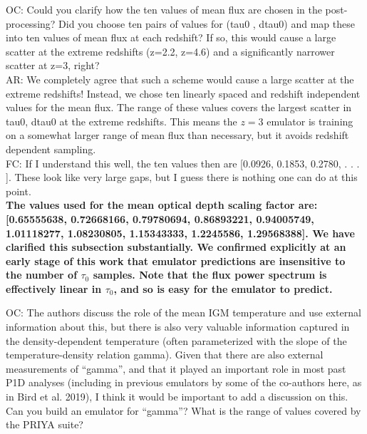 \documentclass[12pt]{article}
\begin{document}
\hrulefill \newline

OC: Could you clarify how the ten values of mean flux are chosen in the post-processing? Did you choose ten pairs of values for (tau0 , dtau0) and map these into ten values of mean flux at each redshift? If so, this would cause a large scatter at the extreme redshifts (z=2.2, z=4.6) and a significantly narrower scatter at z=3, right?\\

AR: We completely agree that such a scheme would cause a large scatter at the extreme redshifts! Instead, we chose ten linearly spaced and redshift independent values for the mean flux. The range of these values covers the largest scatter in tau0, dtau0 at the extreme redshifts. This means the $z=3$ emulator is training on a somewhat larger range of mean flux than necessary, but it avoids redshift dependent sampling.\\

FC: If I understand this well, the ten values then are [0.0926, 0.1853, 0.2780, . . . ]. These look like very large gaps, but I guess there is nothing one can do at this point.\\

\textbf{The values used for the mean optical depth scaling factor are: [0.65555638, 0.72668166, 0.79780694, 0.86893221, 0.94005749, 1.01118277, 1.08230805, 1.15343333, 1.2245586, 1.29568388]. We have clarified this subsection substantially. We confirmed explicitly at an early stage of this work that emulator predictions are insensitive to the number of $\tau_0$ samples. Note that the flux power spectrum is effectively linear in $\tau_0$, and so is easy for the emulator to predict. }\\

\hrulefill \newline

OC: The authors discuss the role of the mean IGM temperature and use external information about this, but there is also very valuable information captured in the density-dependent temperature (often parameterized with the slope of the temperature-density relation gamma). Given that there are also external measurements of “gamma”, and that it played an important role in most past P1D analyses (including in previous emulators by some of the co-authors here, as in Bird et al. 2019), I think it would be important to add a discussion on this. Can you build an emulator for “gamma”? What is the range of values covered by the PRIYA suite?\\
\end{document}
